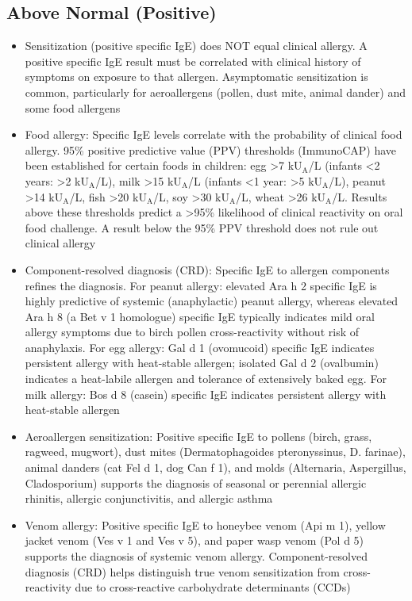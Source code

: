 \subsection*{Above Normal (Positive)}
\begin{itemize}
  \item Sensitization (positive specific IgE) does NOT equal clinical allergy. A positive specific IgE result must be correlated with clinical history of symptoms on exposure to that allergen. Asymptomatic sensitization is common, particularly for aeroallergens (pollen, dust mite, animal dander) and some food allergens
  \item Food allergy: Specific IgE levels correlate with the probability of clinical food allergy. 95\% positive predictive value (PPV) thresholds (ImmunoCAP) have been established for certain foods in children: egg >7 kU$_\text{A}$/L (infants <2 years: >2 kU$_\text{A}$/L), milk >15 kU$_\text{A}$/L (infants <1 year: >5 kU$_\text{A}$/L), peanut >14 kU$_\text{A}$/L, fish >20 kU$_\text{A}$/L, soy >30 kU$_\text{A}$/L, wheat >26 kU$_\text{A}$/L. Results above these thresholds predict a >95\% likelihood of clinical reactivity on oral food challenge. A result below the 95\% PPV threshold does not rule out clinical allergy
  \item Component-resolved diagnosis (CRD): Specific IgE to allergen components refines the diagnosis. For peanut allergy: elevated Ara h 2 specific IgE is highly predictive of systemic (anaphylactic) peanut allergy, whereas elevated Ara h 8 (a Bet v 1 homologue) specific IgE typically indicates mild oral allergy symptoms due to birch pollen cross-reactivity without risk of anaphylaxis. For egg allergy: Gal d 1 (ovomucoid) specific IgE indicates persistent allergy with heat-stable allergen; isolated Gal d 2 (ovalbumin) indicates a heat-labile allergen and tolerance of extensively baked egg. For milk allergy: Bos d 8 (casein) specific IgE indicates persistent allergy with heat-stable allergen
  \item Aeroallergen sensitization: Positive specific IgE to pollens (birch, grass, ragweed, mugwort), dust mites (Dermatophagoides pteronyssinus, D. farinae), animal danders (cat Fel d 1, dog Can f 1), and molds (Alternaria, Aspergillus, Cladosporium) supports the diagnosis of seasonal or perennial allergic rhinitis, allergic conjunctivitis, and allergic asthma
  \item Venom allergy: Positive specific IgE to honeybee venom (Api m 1), yellow jacket venom (Ves v 1 and Ves v 5), and paper wasp venom (Pol d 5) supports the diagnosis of systemic venom allergy. Component-resolved diagnosis (CRD) helps distinguish true venom sensitization from cross-reactivity due to cross-reactive carbohydrate determinants (CCDs)

\end{itemize}

